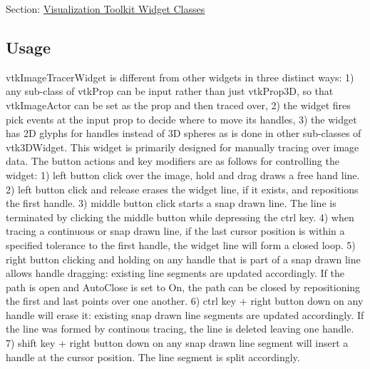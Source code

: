 Section\-: \hyperlink{sec_vtkwidgets}{Visualization Toolkit Widget Classes} \hypertarget{vtkwidgets_vtkxyplotwidget_Usage}{}\subsection{Usage}\label{vtkwidgets_vtkxyplotwidget_Usage}
vtk\-Image\-Tracer\-Widget is different from other widgets in three distinct ways\-: 1) any sub-\/class of vtk\-Prop can be input rather than just vtk\-Prop3\-D, so that vtk\-Image\-Actor can be set as the prop and then traced over, 2) the widget fires pick events at the input prop to decide where to move its handles, 3) the widget has 2\-D glyphs for handles instead of 3\-D spheres as is done in other sub-\/classes of vtk3\-D\-Widget. This widget is primarily designed for manually tracing over image data. The button actions and key modifiers are as follows for controlling the widget\-: 1) left button click over the image, hold and drag draws a free hand line. 2) left button click and release erases the widget line, if it exists, and repositions the first handle. 3) middle button click starts a snap drawn line. The line is terminated by clicking the middle button while depressing the ctrl key. 4) when tracing a continuous or snap drawn line, if the last cursor position is within a specified tolerance to the first handle, the widget line will form a closed loop. 5) right button clicking and holding on any handle that is part of a snap drawn line allows handle dragging\-: existing line segments are updated accordingly. If the path is open and Auto\-Close is set to On, the path can be closed by repositioning the first and last points over one another. 6) ctrl key + right button down on any handle will erase it\-: existing snap drawn line segments are updated accordingly. If the line was formed by continous tracing, the line is deleted leaving one handle. 7) shift key + right button down on any snap drawn line segment will insert a handle at the cursor position. The line segment is split accordingly.

